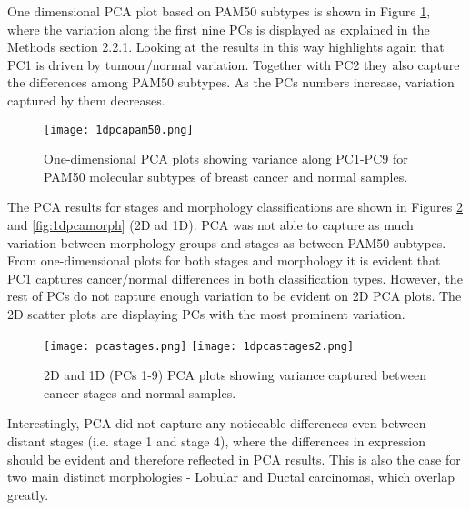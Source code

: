     \newpage
    One dimensional PCA plot based on PAM50 subtypes is shown in Figure \ref{fig:1dpcapam50}, where the variation along the first nine PCs is displayed as explained in the Methods section 2.2.1. Looking at the results in this way highlights again that PC1 is driven by tumour/normal variation. Together with PC2 they also capture the differences among PAM50 subtypes. As the PCs numbers increase, variation captured by them decreases. 
    
            \begin{figure}[!h]
            \centering
            \texttt{[image: 1dpcapam50.png]}
            \caption[PCA plot showing separation by PAM50 subtypes (1D)]{One-dimensional PCA plots showing variance along PC1-PC9 for PAM50 molecular subtypes of breast cancer and normal samples. }
            \label{fig:1dpcapam50}
            \end{figure}
    
    
    The PCA results for stages and morphology classifications are shown in Figures \ref{fig:1dpcastage} and \ref{fig:1dpcamorph} (2D ad 1D). PCA was not able to capture as much variation between morphology groups and stages as between PAM50 subtypes. From one-dimensional plots for both stages and morphology it is evident that PC1 captures cancer/normal differences in both classification types. However, the rest of PCs do not capture enough variation to be evident on 2D PCA plots. The 2D scatter plots are displaying PCs with the most prominent variation.     
    
            
            \begin{figure}[!h]
            \hspace*{\fill}
            \texttt{[image: pcastages.png]}\hfill
            \texttt{[image: 1dpcastages2.png]}
            \hspace*{\fill}
            \caption[PCA plots (2D and 1D) showing separation by cancer stages]{2D and 1D (PCs 1-9) PCA plots showing variance captured between cancer stages and normal samples.}
            \label{fig:1dpcastage}
            \end{figure}
            
        Interestingly, PCA did not capture any noticeable differences even between distant stages (i.e. stage 1 and stage 4), where the differences in expression should be evident and therefore reflected in PCA results. This is also the case for two main distinct morphologies - Lobular and Ductal carcinomas, which overlap greatly.
    
